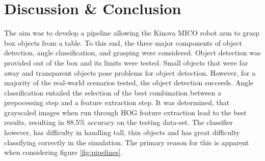 \documentclass[letterpaper, 10 pt, conference]{conf/ieeeconf}  %
\begin{document}
\section{Discussion \& Conclusion}
\label{sec:discussion}
The aim was to develop a pipeline allowing the Kinova MICO robot arm to grasp
box objects from a table. To this end, the three major components of object
detection, angle classification, and grasping were considered. Object detection
was provided out of the box and its limits were tested. Small objects that were
far away and transparent objects pose problems for object detection. However,
for a majority of the real-world scenarios tested, the object detection
succeeds. Angle classification entailed the selection of the best combination
between a prepocessing step and a feature extraction step. It was determined,
that grayscaled images when run through HOG feature extraction lead to the best
results, resulting in 88.5\% accuracy on the testing data-set. The classifier
however, has difficulty in handling tall, thin objects and has great difficulty
classifying correctly in the simulation. The primary reason for this is apparent
when considering figure \ref{fig:pipelines}.
\end{document}
